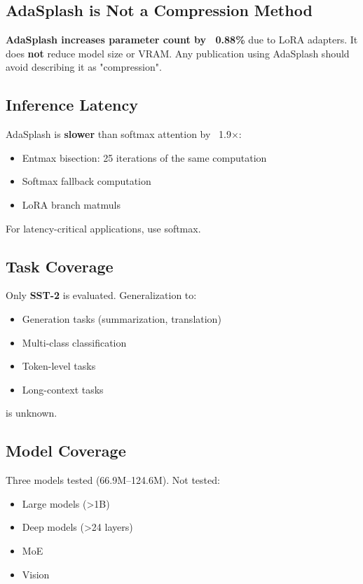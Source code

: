 \subsection{AdaSplash is Not a Compression Method}

\textbf{AdaSplash increases parameter count by ~0.88\%} due to LoRA 
adapters. It does \textbf{not} reduce model size or VRAM. Any publication using 
AdaSplash should avoid describing it as "compression".

\subsection{Inference Latency}

AdaSplash is \textbf{slower} than softmax attention by ~1.9$\times$:

\begin{itemize}
\item Entmax bisection: 25 iterations of the same computation
\item Softmax fallback computation
\item LoRA branch matmuls

\end{itemize}
For latency-critical applications, use softmax.

\subsection{Task Coverage}

Only \textbf{SST-2} is evaluated. Generalization to:
\begin{itemize}
\item Generation tasks (summarization, translation)
\item Multi-class classification
\item Token-level tasks
\item Long-context tasks

\end{itemize}
is unknown.

\subsection{Model Coverage}

Three models tested (66.9M--124.6M). Not tested:
\begin{itemize}
\item Large models (>1B)
\item Deep models (>24 layers)
\item MoE
\item Vision

\end{itemize}
